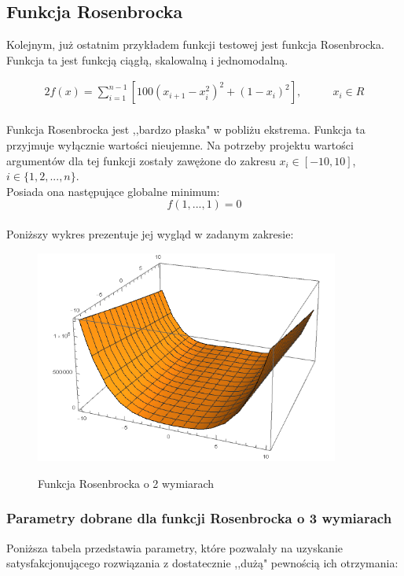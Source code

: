 \documentclass[twoside]{projektInzynierskiMS1}
\newcommand{\si}{ś}
\begin{document}
	\subsection{Funkcja Rosenbrocka}
Kolejnym, już ostatnim przykładem funkcji testowej jest funkcja Rosenbrocka. Funkcja ta jest funkcją ciągłą, skalowalną i jednomodalną.


\begin{alignat*}{2}
f(x) = \sum_{i=1}^{n-1} \left[100\left(x_{i+1} - x_i^2\right)^2 + \left(1- x_i\right)^2\right],&\qquad  x_i \in R\\
\end{alignat*}

Funkcja Rosenbrocka jest ,,bardzo płaska" w pobliżu ekstrema. Funkcja ta przyjmuje wyłącznie warto\si ci nieujemne. Na potrzeby projektu warto\si ci argumentów dla tej funkcji zostały zawężone do zakresu $x_i \in [-10, 10]$, $i \in \{ 1, 2, ..., n\}$. \\

Posiada ona następujące globalne minimum:
\[ f(1,...,1) = 0 \] \\

Poniższy wykres prezentuje jej wygląd w zadanym zakresie:\\
\begin{figure}[H]
	\begin{center}
		\includegraphics[height=7cm]{pics/rosenbrockFunction1.png}\\
	\end{center}
	\caption{Funkcja Rosenbrocka o 2 wymiarach}
\end{figure}

	\subsubsection{Parametry dobrane dla funkcji Rosenbrocka o 3 wymiarach}
Poniższa tabela przedstawia parametry, które pozwalały na uzyskanie satysfakcjonującego rozwiązania z dostatecznie ,,dużą" pewno\si cią ich otrzymania: \\
\end{document}
